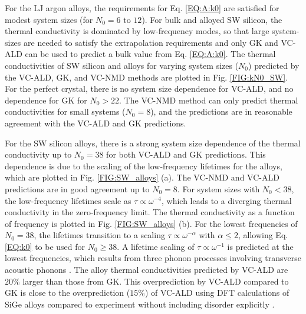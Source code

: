 For the LJ argon alloys, the requirements for Eq. \eqref{EQ:A:k0} 
are satisfied for modest system 
sizes (for $N_0 = 6$ to $12$). 
For bulk and alloyed SW silicon, the thermal conductivity is dominated by 
low-frequency modes, so that large system-sizes are needed to satisfy 
the extrapolation requirements and only GK and VC-ALD can be used to 
predict a bulk value from Eq. \eqref{EQ:A:k0}. The thermal conductivities 
of SW silicon and alloys for varying system sizes ($N_0$) predicted 
by the VC-ALD, GK, and VC-NMD methods are plotted in 
Fig. \ref{FIG:kN0_SW}. For the perfect crystal, there is no system size 
dependence for VC-ALD, and no dependence for GK for $N_0 > 22$. The VC-NMD 
method can only predict thermal conductivities for small systems 
($N_0 = 8$), and the predictions are in reasonable agreement with the 
VC-ALD and GK predictions. 

For the SW silicon alloys, there is a strong system size dependence of the 
thermal conductivity up to $N_0 = 38$ for both VC-ALD and GK predictions. 
This dependence is due to the scaling of the 
low-frequency lifetimes for the alloys, which are plotted in 
Fig. \ref{FIG:SW_alloys} (a). 
The VC-NMD and VC-ALD predictions are in good agreement up to $N_0 = 8$. 
For system sizes with $N_0 < 38$, the low-frequency 
lifetimes scale as $\tau \propto \omega^{-4}$, which leads to a diverging 
thermal conductivity in the zero-frequency limit. 
The thermal conductivity as a function of 
frequency is plotted in Fig. \ref{FIG:SW_alloys} (b). 
For the lowest frequencies of $N_0 = 38$, the lifetimes transition to a 
scaling $\tau \propto \omega^{-\alpha}$ with $\alpha \le 2$,   
allowing Eq. \eqref{EQ:k0} to be used for $N_0 \ge 38$. 
A lifetime scaling of $\tau \propto \omega^{-1}$ 
is predicted at the lowest frequencies, which results from three 
phonon processes involving transverse acoustic phonons 
\cite{landau_absorption_1937,price_acoustic_1971}. 
The alloy thermal conductivities predicted 
by VC-ALD are $20\%$ larger than those from GK. This overprediction 
by VC-ALD compared to GK is close to the overprediction ($15\%$) of VC-ALD 
using DFT calculations of SiGe alloys compared to experiment 
without including disorder explicitly \cite{garg_role_2011}. 

